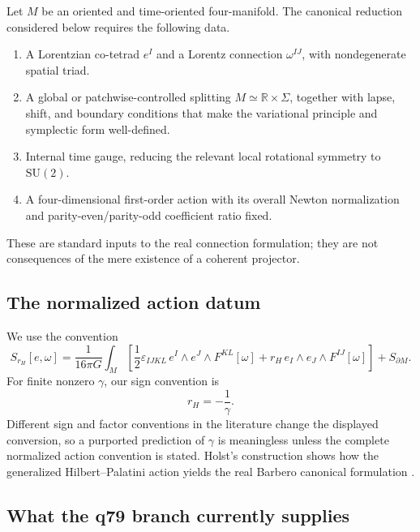 \documentclass[11pt]{article}
\theoremstyle{plain}
\newcommand{\SU}{\mathrm{SU}(2)}
\newcommand{\eps}{\varepsilon}
\begin{document}
Let \(M\) be an oriented and time-oriented four-manifold. The canonical
reduction considered below requires the following data.
\begin{enumerate}
\item A Lorentzian co-tetrad \(e^I\) and a Lorentz connection
  \(\omega^{IJ}\), with nondegenerate spatial triad.
\item A global or patchwise-controlled splitting
  \(M\simeq\mathbb R\times\Sigma\), together with lapse, shift, and boundary
  conditions that make the variational principle and symplectic form
  well-defined.
\item Internal time gauge, reducing the relevant local rotational symmetry
  to \(\SU\).
\item A four-dimensional first-order action with its overall Newton
  normalization and parity-even/parity-odd coefficient ratio fixed.
\end{enumerate}
These are standard inputs to the real connection formulation; they are not
consequences of the mere existence of a coherent projector.

\subsection{The normalized action datum}

We use the convention
\begin{equation}
\label{eq:holst-action}
 S_{r_H}[e,\omega]
 =
 \frac{1}{16\pi G}
 \int_M
 \left[
  \frac12\eps_{IJKL}\,
       e^I\wedge e^J\wedge F^{KL}[\omega]
  +r_H\,e_I\wedge e_J\wedge F^{IJ}[\omega]
 \right]
 +S_{\partial M}.
\end{equation}
For finite nonzero \(\gamma\), our sign convention is
\begin{equation}
\label{eq:ratio}
 r_H=-\frac{1}{\gamma}.
\end{equation}
Different sign and factor conventions in the literature change the displayed
conversion, so a purported prediction of \(\gamma\) is meaningless unless
the complete normalized action convention is stated. Holst's construction
shows how the generalized Hilbert--Palatini action yields the real Barbero
canonical formulation \cite{Holst1996,Barbero1995}.

\subsection{What the q79 branch currently supplies}
\end{document}
